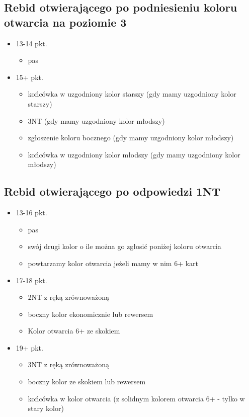 \documentclass{article}
\begin{document}
    	\subsection{Rebid otwierającego po podniesieniu koloru otwarcia na poziomie 3}
    	\begin{itemize}
    		\item 13-14 pkt.
    			\begin{itemize}
    				\item pas
    			\end{itemize}
    		\item 15+ pkt.
    			\begin{itemize}
    				\item końcówka w uzgodniony kolor starszy (gdy mamy uzgodniony kolor starszy)
    				\item 3NT (gdy mamy uzgodniony kolor młodszy)
    				\item zgłoszenie koloru bocznego (gdy mamy uzgodniony kolor młodszy)
    				\item końcówka w uzgodniony kolor młodszy (gdy mamy uzgodniony kolor młodszy)
    			\end{itemize}
    	\end{itemize}
    	\subsection{Rebid otwierającego po odpowiedzi 1NT}
    	\begin{itemize}
    		\item 13-16 pkt.
    			\begin{itemize}
    				\item pas
    				\item swój drugi kolor o ile można go zgłosić poniżej koloru otwarcia
    				\item powtarzamy kolor otwarcia jeżeli mamy w nim 6+ kart
    			\end{itemize}
    		\item 17-18 pkt.
    			\begin{itemize}
    				\item 2NT z ręką zrównoważoną
    				\item boczny kolor ekonomicznie lub rewersem
    				\item Kolor otwarcia 6+ ze skokiem
    			\end{itemize}
    		\item 19+ pkt.
    			\begin{itemize}
    				\item 3NT z ręką zrównoważoną
    				\item boczny kolor ze skokiem lub rewersem
    				\item końcówka w kolor otwarcia (z solidnym kolorem otwarcia 6+ - tylko w stary kolor)
    			\end{itemize}
    	\end{itemize}
\end{document}
